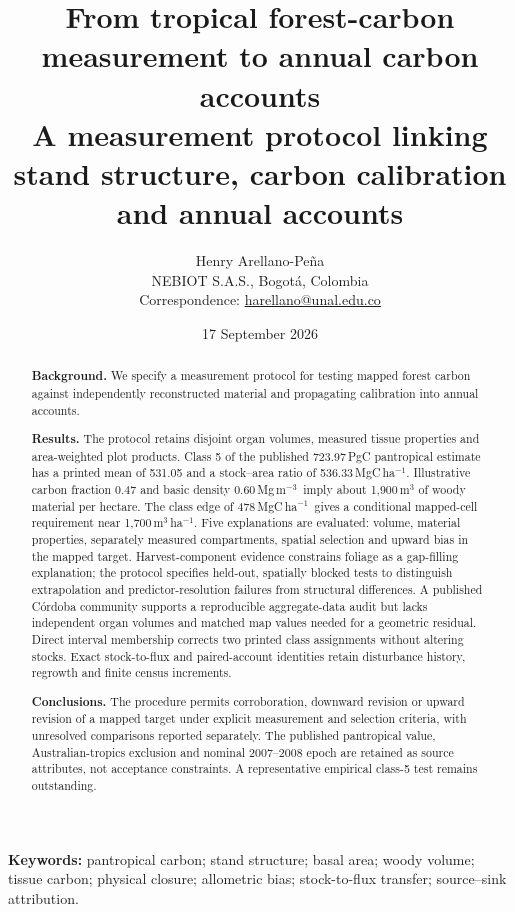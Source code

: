\documentclass[11pt,a4paper]{article}
\title{\vspace{-1.2em}\textbf{From tropical forest-carbon measurement to annual carbon accounts}\\[.5em]
\large A measurement protocol linking stand structure, carbon calibration and annual accounts}
\author{Henry Arellano-Pe\~na\\[.3em]\small NEBIOT S.A.S., Bogot\'a, Colombia\\[.2em]\small Correspondence: \href{mailto:harellano@unal.edu.co}{harellano@unal.edu.co}}
\date{17 September 2026}
\theoremstyle{remark}
\begin{document}
\maketitle
\thispagestyle{empty}
\begin{abstract}
\textbf{Background.} We specify a measurement protocol for testing mapped forest carbon against independently reconstructed material and propagating calibration into annual accounts.

\textbf{Results.} The protocol retains disjoint organ volumes, measured tissue properties and area-weighted plot products. Class 5 of the published 723.97\,PgC pantropical estimate has a printed mean of 531.05 and a stock--area ratio of 536.33\,MgC\,ha$^{-1}$. Illustrative carbon fraction 0.47 and basic density 0.60\,Mg\,m$^{-3}$\ imply about 1,900\,m$^3$ of woody material per hectare. The class edge of 478\,MgC\,ha$^{-1}$\ gives a conditional mapped-cell requirement near 1,700\,m$^3$\,ha$^{-1}$. Five explanations are evaluated: volume, material properties, separately measured compartments, spatial selection and upward bias in the mapped target. Harvest-component evidence constrains foliage as a gap-filling explanation; the protocol specifies held-out, spatially blocked tests to distinguish extrapolation and predictor-resolution failures from structural differences. A published C\'ordoba community supports a reproducible aggregate-data audit but lacks independent organ volumes and matched map values needed for a geometric residual. Direct interval membership corrects two printed class assignments without altering stocks. Exact stock-to-flux and paired-account identities retain disturbance history, regrowth and finite census increments.

\textbf{Conclusions.} The procedure permits corroboration, downward revision or upward revision of a mapped target under explicit measurement and selection criteria, with unresolved comparisons reported separately. The published pantropical value, Australian-tropics exclusion and nominal 2007--2008 epoch are retained as source attributes, not acceptance constraints. A representative empirical class-5 test remains outstanding.
\end{abstract}
\noindent\textbf{Keywords:} pantropical carbon; stand structure; basal area; woody volume; tissue carbon; physical closure; allometric bias; stock-to-flux transfer; source--sink attribution.
\end{document}
